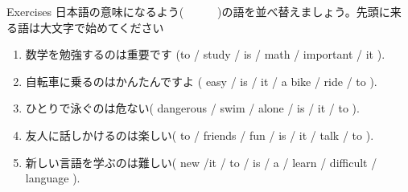 \documentclass[aspectratio=169,xcolor={dvipsnames,table}]{beamer}
\begin{document}
\begin{frame}[plain]{Exercises}
日本語の意味になるよう(~~~~~~)の語を並べ替えましょう。先頭に来る語は大文字で始めてください\mbox{}\hfill{\scriptsize {}}
 \begin{enumerate}
  \item  {\small 数学を勉強するのは重要です}
(to / study / is / math / important / it ).\\
  \item  {\small 自転車に乗るのはかんたんですよ}
( easy / is / it / a bike / ride / to ).\\
  \item  {\small ひとりで泳ぐのは危ない}( dangerous / swim / alone / is /  it / to ).\\
  \item  {\small 友人に話しかけるのは楽しい}( to / friends / fun / is / it / talk / to ).\\
  \item  {\small 新しい言語を学ぶのは難しい}( new /it / to / is / a / learn / difficult / language ).\\
 \end{enumerate}
\end{frame}
\end{document}
